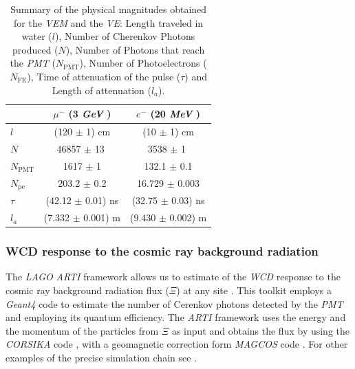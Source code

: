 \documentclass[submitting]{nst}
\begin{document}
\begin{table}[h!]
\label{t:comparacion}
\centering
\caption{Summary of the physical magnitudes obtained for the \textsl{VEM} and the \textsl{VE}: Length traveled in water ($l$), Number of Cherenkov Photons produced ($N$), Number of Photons that reach the \textsl{PMT} ($N_{\mathrm{PMT}}$), Number of Photoelectrons ($N_{\mathrm{FE}}$), Time of attenuation of the pulse ($\tau $) and Length of attenuation ($l_a$).}

\begin{tabular}{l|c|c|}
\cline{2-3}
                                                     & \textbf{$\mu^-$ (3   \textsl{GeV} ) }& \textbf{$e^-$ (20   \textsl{MeV} )} \\ \hline
\multicolumn{1}{|l|}{\textbf{$l$}}   &          (120 $\pm$ 1) cm      &    (10 $\pm$ 1) cm        \\ \hline
\multicolumn{1}{|l|}{\textbf{$N$}}    &         46857 $\pm$ 13 $ $   &      3538 $\pm$ 1 $ $      \\ \hline
\multicolumn{1}{|l|}{$N_{\mathrm{PMT}}$}       &          1617 $\pm$ 1     &     132.1 $\pm$ 0.1      \\ \hline
\multicolumn{1}{|l|}{$N_{\mathrm{pe}}$}       &          203.2 $\pm$ 0.2      &     16.729 $\pm$ 0.003       \\ \hline
\multicolumn{1}{|l|}{$\tau$} &          (42.12 $\pm$ 0.01) ns      &      (32.75 $\pm$ 0.03) ns      \\ \hline
\multicolumn{1}{|l|}{$l_a$} &          (7.332 $\pm$ 0.001) m      &      (9.430 $\pm$ 0.002) m      \\ \hline
\end{tabular}
\end{table}

\subsubsection{WCD response to the cosmic ray background radiation}%
The \textsl{LAGO} \textsl{ARTI} framework allows us to estimate of the \textsl{WCD} response to the cosmic ray background radiation flux ($\Xi$) at any site \cite{SarmientoEtal2019}. This toolkit employs a \textsl{Geant4} code to estimate the number of Cerenkov photons detected by the \textsl{PMT} and employing its quantum efficiency. The \textsl{ARTI} framework uses the energy and the momentum of the particles from $\Xi$ as input and obtains the flux by using the \textsl{CORSIKA} code \cite{HeckEtal1998}, with a geomagnetic correction form \textsl{MAGCOS} code \cite{Desorgher2003}. For other examples of the precise simulation chain see  \cite{AsoreyEtal2015B, AsoreyNunezSuarez2018}. 
\end{document}
